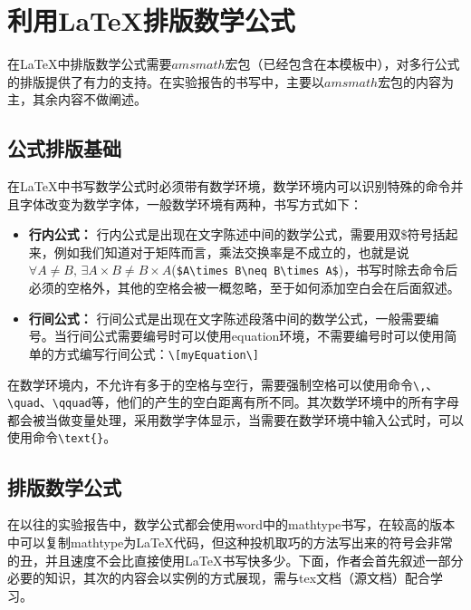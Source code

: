 \section{利用\LaTeX 排版数学公式}
在\LaTeX 中排版数学公式需要$amsmath$宏包（已经包含在本模板中），对多行公式的排版提供了有力的支持。在实验报告的书写中，主要以$amsmath$宏包的内容为主，其余内容不做阐述。
\subsection{公式排版基础}
在\LaTeX 中书写数学公式时必须带有数学环境，数学环境内可以识别特殊的命令并且字体改变为数学字体，一般数学环境有两种，书写方式如下：
\begin{itemize}
\item \textbf{行内公式：} 行内公式是出现在文字陈述中间的数学公式，需要用双\$符号括起来，例如我们知道对于矩阵而言，乘法交换率是不成立的，也就是说$\forall A\neq B,\, \exists A\times B\neq B\times A$(\verb|$A\times B\neq B\times A$|)，书写时除去命令后必须的空格外，其他的空格会被一概忽略，至于如何添加空白会在后面叙述。
\item \textbf{行间公式：} 行间公式是出现在文字陈述段落中间的数学公式，一般需要编号。当行间公式需要编号时可以使用equation环境，不需要编号时可以使用简单的方式编写行间公式：\verb|\[myEquation\]|
\end{itemize}

在数学环境内，不允许有多于的空格与空行，需要强制空格可以使用命令\verb|\,|、\verb|\quad|、\verb|\qquad|等，他们的产生的空白距离有所不同。其次数学环境中的所有字母都会被当做变量处理，采用数学字体显示，当需要在数学环境中输入公式时，可以使用命令\verb|\text{}|。
\subsection{排版数学公式}
在以往的实验报告中，数学公式都会使用word中的mathtype书写，在较高的版本中可以复制mathtype为\LaTeX 代码，但这种投机取巧的方法写出来的符号会非常的丑，并且速度不会比直接使用\LaTeX 书写快多少。下面，作者会首先叙述一部分必要的知识，其次的内容会以实例的方式展现，需与tex文档（源文档）配合学习。

